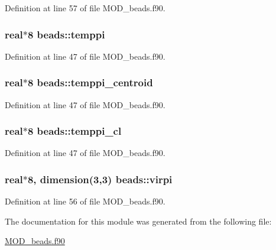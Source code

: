 Definition at line 57 of file M\-O\-D\-\_\-beads.\-f90.

\hypertarget{classbeads_a3621607c4b66d4e86c3ec09d83120d48}{
\subsubsection[{temppi}]{\setlength{\rightskip}{0pt plus 5cm}real$\ast$8 beads\-::temppi}}\label{classbeads_a3621607c4b66d4e86c3ec09d83120d48}


Definition at line 47 of file M\-O\-D\-\_\-beads.\-f90.

\hypertarget{classbeads_adf180574f60cfa67b5fec031adb6971f}{
\subsubsection[{temppi\-\_\-centroid}]{\setlength{\rightskip}{0pt plus 5cm}real$\ast$8 beads\-::temppi\-\_\-centroid}}\label{classbeads_adf180574f60cfa67b5fec031adb6971f}


Definition at line 47 of file M\-O\-D\-\_\-beads.\-f90.

\hypertarget{classbeads_a42ae02a4bcc859289b24ad8674222326}{
\subsubsection[{temppi\-\_\-cl}]{\setlength{\rightskip}{0pt plus 5cm}real$\ast$8 beads\-::temppi\-\_\-cl}}\label{classbeads_a42ae02a4bcc859289b24ad8674222326}


Definition at line 47 of file M\-O\-D\-\_\-beads.\-f90.

\hypertarget{classbeads_a2e963637c44512cc2e0401584593c071}{
\subsubsection[{virpi}]{\setlength{\rightskip}{0pt plus 5cm}real$\ast$8, dimension(3,3) beads\-::virpi}}\label{classbeads_a2e963637c44512cc2e0401584593c071}


Definition at line 56 of file M\-O\-D\-\_\-beads.\-f90.



The documentation for this module was generated from the following file\-:\begin{DoxyCompactItemize}
\item 
\hyperlink{MOD__beads_8f90}{M\-O\-D\-\_\-beads.\-f90}\end{DoxyCompactItemize}
